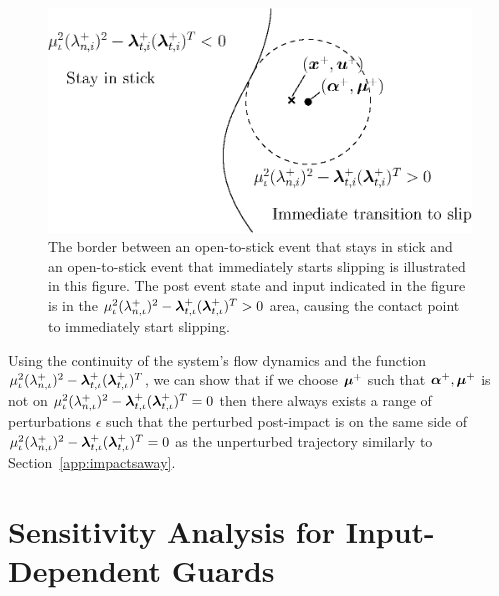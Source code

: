 \documentclass[../DC2019003Bouma.tex]{subfiles}
\begin{document}
\begin{figure}[h]
\centering
\includegraphics[width=.55\textwidth]{stickimmedslip.eps}\caption{The border between an open-to-stick event that stays in stick and an open-to-stick event that immediately starts slipping is illustrated in this figure. The post event state and input indicated in the figure is in the $\mu_{\iota}^2(\lambda^+_{n,\iota})^2 - \boldsymbol{\lambda}^+_{t,\iota}(\boldsymbol{\lambda}^+_{t,\iota})^T > 0$ area, causing the contact point to immediately start slipping.} \label{fig:stickimmedslip}
\end{figure}

Using the continuity of the system's flow dynamics and the function $\mu_{\iota}^2(\lambda^+_{n,\iota})^2 - \boldsymbol{\lambda}^+_{t,\iota}(\boldsymbol{\lambda}^+_{t,\iota})^T$, we can show that if we choose $\boldsymbol{\mu}^+$ such that $\boldsymbol{\alpha}^+,\boldsymbol{\mu}^+$ is not on $\mu_{\iota}^2(\lambda^+_{n,\iota})^2 - \boldsymbol{\lambda}^+_{t,\iota}(\boldsymbol{\lambda}^+_{t,\iota})^T = 0$ then there always exists a range of perturbations $\epsilon$ such that the perturbed post-impact is on the same side of $\mu_{\iota}^2(\lambda^+_{n,\iota})^2 - \boldsymbol{\lambda}^+_{t,\iota}(\boldsymbol{\lambda}^+_{t,\iota})^T = 0$ as the unperturbed trajectory similarly to Section~\ref{app:impactsaway}.

\pagestyle{fancyreport}
\cleartooddpage
\pagestyle{fancyreport}
\chapter{Sensitivity Analysis for Input-Dependent Guards}\label{app:Csensitivity}
\end{document}
